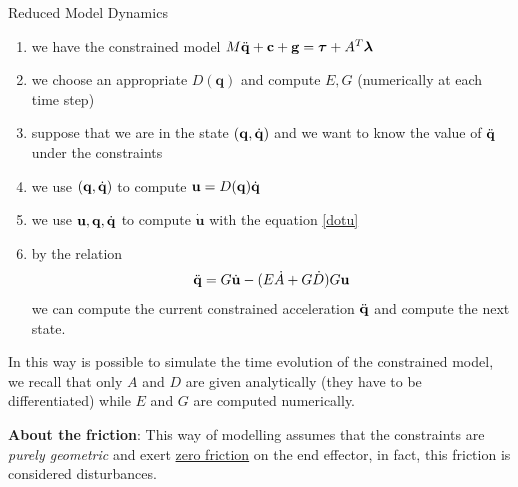 \documentclass[10pt, a4paper]{report}
\newcommand{\q}{{\mathbf q}}
\begin{document}
\begin{boxdefinition}{Reduced Model Dynamics}{}\begin{enumerate}
    \item we have the constrained model $M{\ddot{\mathbf q}}+\mathbf c+\mathbf g={\boldsymbol{\tau}}+A^T\boldsymbol{\lambda}$ 
    \item we choose an appropriate $D(\q)$ and compute $E,G$ (numerically at each time step)
    \item suppose that we are in the state $(\q,\dq)$ and we want to know the value of ${\ddot{\mathbf q}}$ under the constraints 
    \item we use $(\q,\dq)$ to compute $\mathbf u=D(\q)\dq$
    \item we use $\mathbf u,\q,\dq$ to compute $\dot{\mathbf u}$ with the equation \eqref{dotu}
    \item by the relation $$ {\ddot{\mathbf q}}=G \dot{\mathbf u }-(E\dot A+G\dot D)G\mathbf u$$
    we can compute the current constrained acceleration ${\ddot{\mathbf q}}$ and compute the next state.
\end{enumerate}
\end{boxdefinition}
In this way is possible to simulate the time evolution of the constrained model, we recall that only $A$ and $D$ are given analytically (they have to be differentiated) while $E$ and $G$ are computed numerically.\bigskip

\noindent\textbf{About the friction}: This way of modelling assumes that the constraints are \textit{purely geometric} and exert \underline{zero friction} on the end effector, in fact, this friction is considered disturbances.\bigskip
\end{document}
